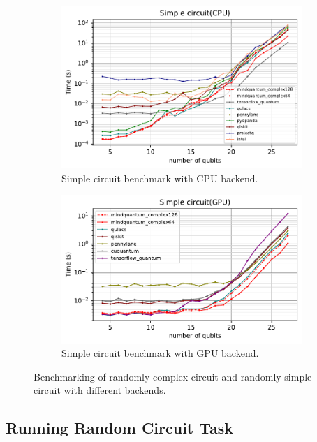 \begin{figure}
\begin{subfigure}{0.45\textwidth}
        \includegraphics[width=\textwidth]{images/7_Simple_circuit_CPU.pdf}
        \caption{Simple circuit benchmark with CPU backend.}
        \label{7_random_circ_cpu}
    \end{subfigure}
    \begin{subfigure}{0.45\textwidth}
        \centering
        \includegraphics[width=\textwidth]{images/7_Simple_circuit_GPU.pdf}
        \caption{Simple circuit benchmark with GPU backend.}
        \label{7_random_circ_gpu}
    \end{subfigure}
    \caption{Benchmarking of randomly complex circuit and randomly simple circuit with different backends.}
    \label{fig:benchmark_circ}
\end{figure}

\subsection{Running Random Circuit Task}

